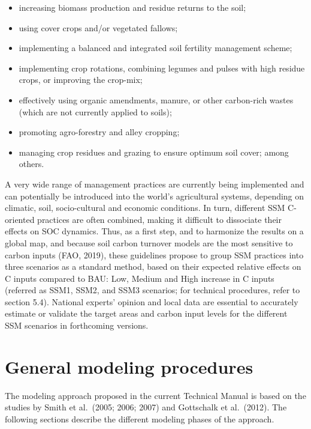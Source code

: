 \documentclass[
  10pt,
  b5paper,
]{book}
\providecommand{\tightlist}{%
  \setlength{\itemsep}{0pt}\setlength{\parskip}{0pt}}
\begin{document}
\begin{itemize}
\tightlist
\item
  increasing biomass production and residue returns to the soil;
\item
  using cover crops and/or vegetated fallows;
\item
  implementing a balanced and integrated soil fertility management scheme;
\item
  implementing crop rotations, combining legumes and pulses with high residue crops, or improving the crop-mix;
\item
  effectively using organic amendments, manure, or other carbon-rich wastes (which are not currently applied to soils);
\item
  promoting agro-forestry and alley cropping;
\item
  managing crop residues and grazing to ensure optimum soil cover; among others.
\end{itemize}

A very wide range of management practices are currently being implemented and can potentially be introduced into the world's agricultural systems, depending on climatic, soil, socio-cultural and economic conditions. In turn, different SSM C-oriented practices are often combined, making it difficult to dissociate their effects on SOC dynamics. Thus, as a first step, and to harmonize the results on a global map, and because soil carbon turnover models are the most sensitive to carbon inputs (FAO, 2019), these guidelines propose to group SSM practices into three scenarios as a standard method, based on their expected relative effects on C inputs compared to BAU: Low, Medium and High increase in C inputs (referred as SSM1, SSM2, and SSM3 scenarios; for technical procedures, refer to section 5.4). National experts' opinion and local data are essential to accurately estimate or validate the target areas and carbon input levels for the different SSM scenarios in forthcoming versions.

\hypertarget{general-modeling-procedures}{%
\section{General modeling procedures}\label{general-modeling-procedures}}

The modeling approach proposed in the current Technical Manual is based on the studies by Smith et al.~(2005; 2006; 2007) and Gottschalk et al.~(2012). The following sections describe the different modeling phases of the approach.
\end{document}
